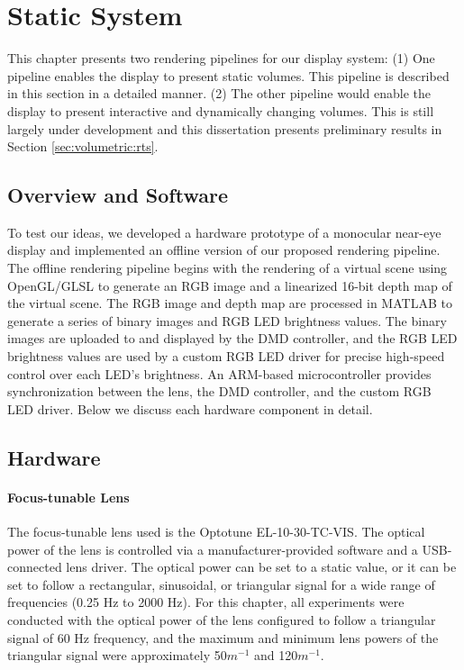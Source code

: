 \section{Static System}
\label{sec:volumetric:static_system}
This chapter presents two rendering pipelines for our display system: (1) One pipeline enables the display to present static volumes. This pipeline is described in this section in a detailed manner. (2) The other pipeline would enable the display to present interactive and dynamically changing volumes. This is still largely under development and this dissertation presents preliminary results in Section \ref{sec:volumetric:rts}.

\subsection{Overview and Software}
To test our ideas, we developed a hardware prototype of a monocular near-eye display and implemented an offline version of our proposed rendering pipeline. The offline rendering pipeline begins with the rendering of a virtual scene using OpenGL/GLSL to generate an RGB image and a linearized 16-bit depth map of the virtual scene. The RGB image and depth map are processed in MATLAB to generate a series of binary images and RGB LED brightness values. The binary images are uploaded to and displayed by the DMD controller, and the RGB LED brightness values are used by a custom RGB LED driver for precise high-speed control over each LED's brightness. An ARM-based microcontroller provides synchronization between the lens, the DMD controller, and the custom RGB LED driver. Below we discuss each hardware component in detail.


\subsection{Hardware}
\paragraph{Focus-tunable Lens} The focus-tunable lens used is the Optotune EL-10-30-TC-VIS. The optical power of the lens is controlled via a manufacturer-provided software and a USB-connected lens driver. The optical power can be set to a static value, or it can be set to follow a rectangular, sinusoidal, or triangular signal for a wide range of frequencies (0.25 Hz to 2000 Hz). For this chapter, all experiments were conducted with the optical power of the lens configured to follow a triangular signal of 60 Hz frequency, and the maximum and minimum lens powers of the triangular signal were approximately 50$m^{-1}$ and 120$m^{-1}$. 


